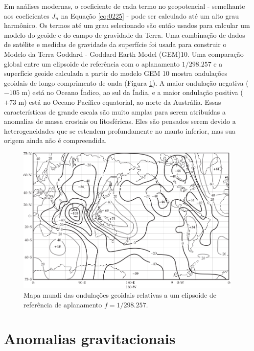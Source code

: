 \documentclass[]{book}
\theoremstyle{definition}
\theoremstyle{definition}
\theoremstyle{definition}
\theoremstyle{remark}
\begin{document}
Em análises modernas, o coeficiente de cada termo no geopotencial - semelhante aos coeficientes \(J_n\) na Equação \eqref{eq:0225} - pode ser calculado até um alto grau harmônico. Os termos até um grau selecionado são então usados para calcular um modelo do geoide e do campo de gravidade da Terra. Uma combinação de dados de satélite e medidas de gravidade da superfície foi usada para construir o Modelo da Terra Goddard - Goddard Earth Model (GEM)10. Uma comparação global entre um elipsoide de referência com o aplanamento \(1/298.257\) e a superfície geoide calculada a partir do modelo GEM 10 mostra ondulações geoidais de longo comprimento de onda (Figura \ref{fig:ondulacao}). A maior ondulação negativa (\(-105\) m) está no Oceano Índico, ao sul da Índia, e a maior ondulação positiva (\(+73\) m) está no Oceano Pacífico equatorial, ao norte da Austrália. Essas características de grande escala são muito amplas para serem atribuídas a anomalias de massa crostais ou litosféricas. Eles são pensados serem devido a heterogeneidades que se estendem profundamente no manto inferior, mas sua origem ainda não é compreendida.

\begin{figure}

{\centering \includegraphics[width=0.8\linewidth]{fig/Fig_02.26} 

}

\caption{Mapa mundi das ondulações geoidais relativas a um elipsoide de referência de aplanamento $f= 1/298.257$. }\label{fig:ondulacao}
\end{figure}

\hypertarget{anomalias-gravitacionais}{%
\section{Anomalias gravitacionais}\label{anomalias-gravitacionais}}
\end{document}
